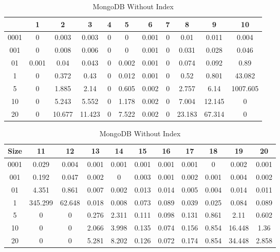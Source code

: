 \begin{center}
\begin{table} [ht]
\tiny
\caption{MongoDB Without Index}
\label{mongodb-noindex-query-result-table}
\begin{tabular}{|c|c|c|c|c|c|c|c|c|c|c| } 
    &  1 & 2 & 3 & 4 & 5 & 6 & 7 & 8 & 9 & 10 \\
 \hline
0001 & 0 & 0.003 & 0.003 & 0 & 0 & 0.001 & 0 & 0.01 & 0.011 & 0.004	\\
001 & 0 & 0.008 & 0.006 & 0 & 0 & 0.001 & 0 & 0.031 & 0.028 & 0.046	\\
01 & 0.001 & 0.04 & 0.043 & 0 & 0.002 & 0.001 & 0 & 0.074 & 0.092 & 0.89	\\
1 & 0 & 0.372 & 0.43 & 0 & 0.012 & 0.001 & 0 & 0.52 & 0.801 & 43.082	\\
5 & 0 & 1.885 & 2.14 & 0 & 0.605 & 0.002 & 0 & 2.757 & 6.14 & 1007.605	\\
10 & 0 & 5.243 & 5.552 & 0 & 1.178 & 0.002 & 0 & 7.004 & 12.145 & 0	\\
20 & 0 & 10.677 & 11.423 & 0 & 7.522 & 0.002 & 0 & 23.183 & 67.314 & 0	\\


\end{tabular}
\begin{tabular}{|c|c|c|c|c|c|c|c|c|c|c| } 
Size & 11 & 12 & 13 & 14 & 15 & 16 & 17 & 18 & 19 & 20	\\
\hline
0001 & 0.029 & 0.004 & 0.001 & 0.001 & 0.001 & 0.001 & 0.001 & 0 & 0.002 & 0.001	\\
001 & 0.192 & 0.047 & 0.002 & 0 & 0.003 & 0.001 & 0.002 & 0.001 & 0.004 & 0.002	\\
01 & 4.351 & 0.861 & 0.007 & 0.002 & 0.013 & 0.014 & 0.005 & 0.004 & 0.014 & 0.011	\\
1 & 345.299 & 62.648 & 0.018 & 0.008 & 0.073 & 0.089 & 0.039 & 0.025 & 0.084 & 0.089	\\
5 & 0 & 0 & 0.276 & 2.311 & 0.111 & 0.098 & 0.131 & 0.861 & 2.11 & 0.602	\\
10 & 0 & 0 & 2.066 & 3.998 & 0.135 & 0.074 & 0.156 & 0.854 & 16.448 & 1.36	\\
20 & 0 & 0 & 5.281 & 8.202 & 0.126 & 0.072 & 0.174 & 0.854 & 34.448 & 2.858	\\

\end{tabular}
\end{table}


\end{center}

